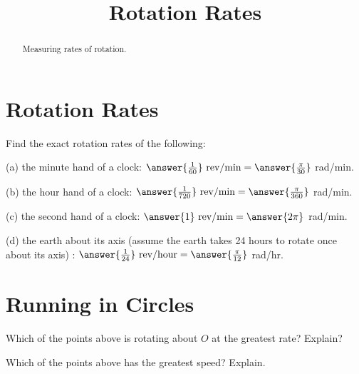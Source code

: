 \documentclass{ximera}
\title{Rotation Rates}
\begin{document}
\begin{abstract}
Measuring rates of rotation.
\end{abstract}
\maketitle




\section{Rotation Rates}
\begin{question}  \label{Q245: Angles}
Find the exact rotation rates of the following:

(a) the minute hand of a clock: $\answer{\frac{1}{60}} \text{ rev/min} = \answer{\frac{\pi}{30}}$ rad/min. 

(b) the hour hand of a clock: $\answer{\frac{1}{720}} \text{ rev/min} =\answer{\frac{\pi}{360}}$ rad/min. 

(c) the second hand of a clock: $\answer{1} \text{ rev/min} =\answer{2\pi}$ rad/min. 

(d) the earth about its axis (assume the earth takes 24 hours to rotate once about its axis) : $\answer{\frac{1}{24}} \text{ rev/hour} =\answer{\frac{\pi}{12}}$ rad/hr.

\end{question}

\section{Running in Circles}
\begin{exploration}
 
\begin{onlineOnly}
    \begin{center}
\end{center}
\end{onlineOnly}


\begin{question} \label{Q72:Angles}
Which of the points above is rotating about $O$ at the greatest rate? Explain?
\begin{multipleChoice}  
\end{multipleChoice}  
\end{question}

\begin{question} \label{Q72:Angles}
Which of the points above has the greatest speed? Explain.
\begin{multipleChoice}  
\end{multipleChoice}  
\end{question}
\end{exploration}
\end{document}
